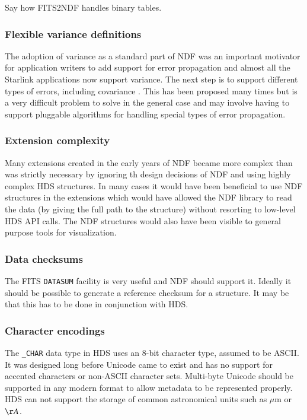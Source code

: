 \documentclass[final,authoryear,5p,times,twocolumn]{elsarticle}
\begin{document}
{{\color{red} Say how FITS2NDF handles binary tables.}

\subsubsection{Flexible variance definitions}

The adoption of variance as a standard part of NDF was an important
motivator for application writers to add support for error propagation and
almost all the Starlink applications now support variance. The next
step is to support different types of errors, including
covariance \citep[see e.g.][]{1992ESOC...41...47M}. This has been proposed many times \citep[see
e.g.][]{1991STARB...8...19M} but is a very difficult problem to solve
in the general case and may involve having to support pluggable
algorithms for handling special types of error propagation.

\subsubsection{Extension complexity}

Many extensions created in the early years of NDF became more complex
than was strictly necessary by ignoring th design decisions of NDF and
using highly complex HDS structures. In many cases it would have been
beneficial to use NDF structures in the extensions which would have
allowed the NDF library to read the data (by giving the full path to
the structure) without resorting to low-level HDS API calls. The NDF
structures would also have been visible to general purpose tools for
visualization.

\subsubsection{Data checksums}

The FITS \texttt{DATASUM} facility is very useful and NDF should support
it. Ideally it should be possible to generate a reference checksum for
a structure. It may be that this has to be done in conjunction with
HDS.

\subsubsection{Character encodings}

The \texttt{\_CHAR} data type in HDS uses an 8-bit character type,
assumed to be ASCII. It was designed long before Unicode came to exist
and has no support for accented characters or non-ASCII character
sets. Multi-byte Unicode should be supported in any modern format to
allow metadata to be represented properly. HDS can not support the
storage of common astronomical units such as $\mu$m or $\AA$.

}
\end{document}
